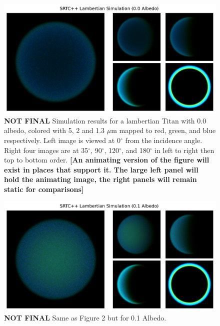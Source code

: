 \documentclass[twocolumn,linenumbers]{aastex631}
\begin{document}
\begin{figure}[htbp]
\includegraphics[scale = 0.4]{LambertianSimA0.pdf}
\centering
\caption{\textbf{\color{red} NOT FINAL \color{black}}Simulation results for a lambertian Titan with 0.0 albedo, colored with 5, 2 and 1.3 $\mu$m mapped to red, green, and blue respectively. Left image is viewed at 0$^{\circ}$  from the incidence angle. Right four images are at  35$^{\circ}$, 90$^{\circ}$, 120$^{\circ}$, and 180$^{\circ}$ in left to right then top to bottom order. \textbf{\color{red}[An animating version of the figure will exist in places that support it. The large left panel will hold the animating image, the right panels will remain static for comparisons] \color{black}}}
\label{fig:2}
\end{figure}

\begin{figure}[htbp]
\includegraphics[scale = 0.4]{LambertianSim.pdf}
\centering
\caption{\textbf{\color{red} NOT FINAL \color{black}}Same as Figure 2 but for 0.1 Albedo.}
\label{fig:3}
\end{figure}
\end{document}
